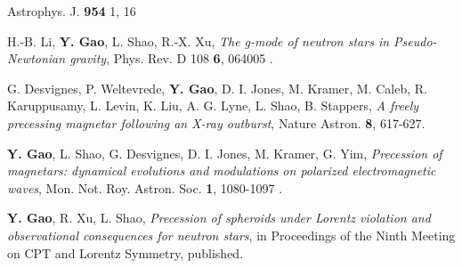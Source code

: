 \begin{etaremune}
  Astrophys. J. {\bf 954} { 1}, 16
  \item
  H.-B. Li, 
  {\bf Y. Gao}, 
  L. Shao, 
  R.-X. Xu, 
  {\it The g-mode of neutron stars in Pseudo-Newtonian gravity}, 
  Phys. Rev. D 108 {\bf 6}, 064005
  .
  \item
  G. Desvignes, 
  P. Weltevrede, 
  {\bf Y. Gao}, 
  D. I. Jones, 
  M. Kramer, 
  M. Caleb, 
  R. Karuppusamy, 
  L. Levin, 
  K. Liu, 
  A. G. Lyne, 
  L. Shao, 
  B. Stappers, 
  {\it A freely precessing magnetar following an X-ray outburst}, 
  Nature Astron. {\bf 8}, 617-627.
  \item  
  {\bf Y. Gao},
  L. Shao,
  G. Desvignes,
  D. I. Jones,
  M. Kramer,
  G. Yim,
  {\it Precession of magnetars: dynamical evolutions and modulations on polarized electromagnetic waves},
   Mon. Not. Roy. Astron. Soc. {\bf 1}, 1080-1097 
  .
  \item 
  {\bf Y. Gao}, 
  R. Xu, 
  L. Shao, 
  {\it Precession of spheroids under Lorentz violation and observational consequences for neutron stars}, 
  in Proceedings of the Ninth Meeting on CPT and Lorentz Symmetry, published.


\end{etaremune}
